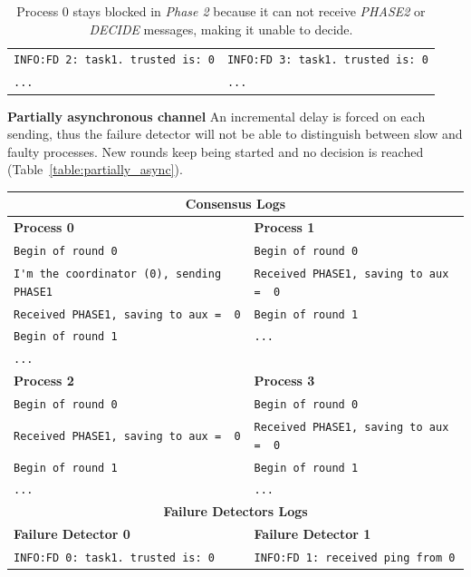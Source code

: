 \documentclass[a4paper]{article}
\begin{document}
\begin{compactitem}
\begin{table}[H]
\begin{tabular}{ll}
		\verb|INFO:FD 2: task1. trusted is: 0| & \verb|INFO:FD 3: task1. trusted is: 0| \\
		\verb|...| & \verb|...| \\
        \bottomrule
        \end{tabular}
        \caption{\small{Process $0$ stays blocked in \emph{Phase 2} because it can not receive \emph{PHASE2} or \emph{DECIDE} messages, making it unable to decide.}}
        \label{table:perfect_channel}
	\end{table}
  \item \textbf{Partially asynchronous channel} An incremental delay is forced on each sending, thus the failure detector will not be able to distinguish between slow and faulty processes. New rounds keep being started and no decision is reached (Table~\ref{table:partially_async}).
  	\begin{table}[H]
		\centering\scriptsize
        \begin{tabular}{ll}
		\toprule
        \multicolumn{2}{c}{\textbf{Consensus Logs}} \\
        \midrule
		\textbf{Process 0} & \textbf{Process 1} \\
		\midrule
        \verb|Begin of round 0| & \verb|Begin of round 0| \\
		\verb|I'm the coordinator (0), sending PHASE1| & \verb|Received PHASE1, saving to aux =  0| \\
		\verb|Received PHASE1, saving to aux =  0| & \verb|Begin of round 1| \\
    \verb|Begin of round 1| & \verb|...| \\
    \verb|...| & \\
        \midrule
		\textbf{Process 2} & \textbf{Process 3} \\
		\midrule
        \verb|Begin of round 0| & \verb|Begin of round 0| \\
		\verb|Received PHASE1, saving to aux =  0| & \verb|Received PHASE1, saving to aux =  0| \\
    \verb|Begin of round 1| & \verb|Begin of round 1| \\
    \verb|...| & \verb|...| \\
        \bottomrule\toprule
		\multicolumn{2}{c}{\textbf{Failure Detectors Logs}} \\
		\midrule
		\textbf{Failure Detector 0} & \textbf{Failure Detector 1} \\
		\midrule
		\verb|INFO:FD 0: task1. trusted is: 0| & \verb|INFO:FD 1: received ping from 0| \\

\end{tabular}
\end{table}
\end{compactitem}
\end{document}
